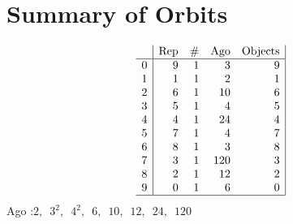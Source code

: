\section*{Summary of Orbits}
$$
\begin{array}{r|*{4}{r}|}
 & \mbox{Rep} & \# & \mbox{Ago} & \mbox{Objects}\\
\hline
0 & 9 & 1 & 3 & 9\\
1 & 1 & 1 & 2 & 1\\
2 & 6 & 1 & 10 & 6\\
3 & 5 & 1 & 4 & 5\\
4 & 4 & 1 & 24 & 4\\
5 & 7 & 1 & 4 & 7\\
6 & 8 & 1 & 3 & 8\\
7 & 3 & 1 & 120 & 3\\
8 & 2 & 1 & 12 & 2\\
9 & 0 & 1 & 6 & 0\\
\hline
\end{array}
$$
Ago :$2,\,$ $3^2,\,$ $4^2,\,$ $6,\,$ $10,\,$ $12,\,$ $24,\,$ $120$ \\
